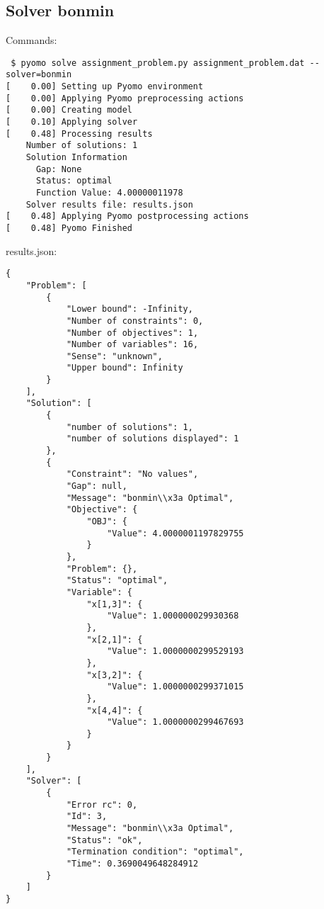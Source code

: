\documentclass[a4paper]{article}
\begin{document}
\subsection*{Solver bonmin}
Commands:
\begin{verbatim}
 $ pyomo solve assignment_problem.py assignment_problem.dat --solver=bonmin
[    0.00] Setting up Pyomo environment
[    0.00] Applying Pyomo preprocessing actions
[    0.00] Creating model
[    0.10] Applying solver
[    0.48] Processing results
    Number of solutions: 1
    Solution Information
      Gap: None
      Status: optimal
      Function Value: 4.00000011978
    Solver results file: results.json
[    0.48] Applying Pyomo postprocessing actions
[    0.48] Pyomo Finished
\end{verbatim}
results.json:
\begin{verbatim}
{
    "Problem": [
        {
            "Lower bound": -Infinity, 
            "Number of constraints": 0, 
            "Number of objectives": 1, 
            "Number of variables": 16, 
            "Sense": "unknown", 
            "Upper bound": Infinity
        }
    ], 
    "Solution": [
        {
            "number of solutions": 1, 
            "number of solutions displayed": 1
        }, 
        {
            "Constraint": "No values", 
            "Gap": null, 
            "Message": "bonmin\\x3a Optimal", 
            "Objective": {
                "OBJ": {
                    "Value": 4.0000001197829755
                }
            }, 
            "Problem": {}, 
            "Status": "optimal", 
            "Variable": {
                "x[1,3]": {
                    "Value": 1.000000029930368
                }, 
                "x[2,1]": {
                    "Value": 1.0000000299529193
                }, 
                "x[3,2]": {
                    "Value": 1.0000000299371015
                }, 
                "x[4,4]": {
                    "Value": 1.0000000299467693
                }
            }
        }
    ], 
    "Solver": [
        {
            "Error rc": 0, 
            "Id": 3, 
            "Message": "bonmin\\x3a Optimal", 
            "Status": "ok", 
            "Termination condition": "optimal", 
            "Time": 0.3690049648284912
        }
    ]
}\end{verbatim}

\end{document}
